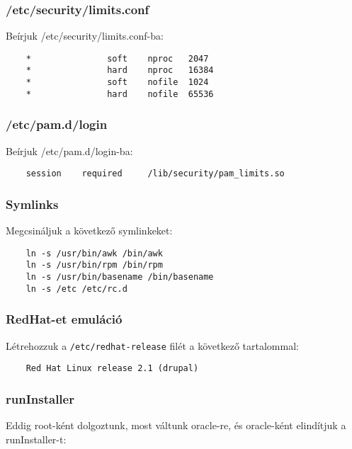 \subsubsection*{/etc/security/limits.conf}

Beírjuk /etc/security/limits.conf-ba:

\begin{verbatim}
    *               soft    nproc   2047
    *               hard    nproc   16384
    *               soft    nofile  1024
    *               hard    nofile  65536
\end{verbatim}


\subsubsection*{/etc/pam.d/login}

Beírjuk /etc/pam.d/login-ba:

\begin{verbatim}
    session    required     /lib/security/pam_limits.so
\end{verbatim}


\subsubsection*{Symlinks}

Megcsináljuk a következő symlinkeket:

\begin{verbatim}
    ln -s /usr/bin/awk /bin/awk
    ln -s /usr/bin/rpm /bin/rpm
    ln -s /usr/bin/basename /bin/basename
    ln -s /etc /etc/rc.d
\end{verbatim}


\subsubsection*{RedHat-et emuláció}

Létrehozzuk a \verb!/etc/redhat-release!
filét a következő tartalommal:

\begin{verbatim}
    Red Hat Linux release 2.1 (drupal)
\end{verbatim}


\subsubsection*{runInstaller}

Eddig root-ként dolgoztunk, most váltunk oracle-re,
és oracle-ként elindítjuk  a runInstaller-t:

